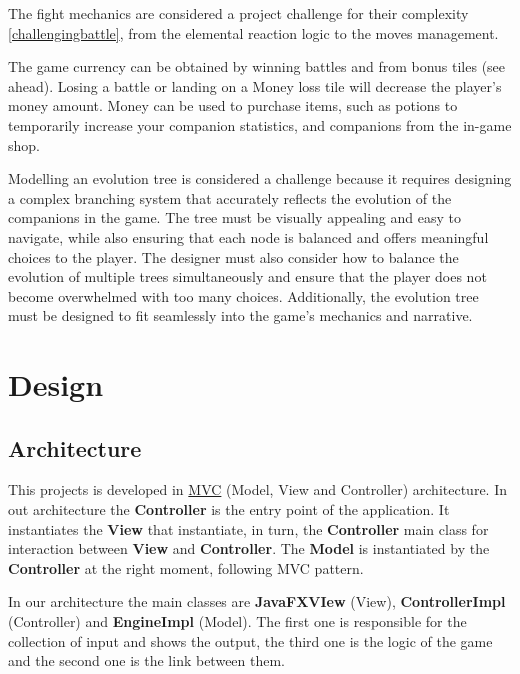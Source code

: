 \documentclass[12pt, a4paper]{report}
\begin{document}
    The fight mechanics are considered a project challenge for their complexity \ref{challengingbattle}, from the elemental reaction logic to the moves management.

    The game currency can be obtained by winning battles and from bonus tiles (see ahead).
    Losing a battle or landing on a Money loss tile will decrease the player's money amount.
    Money can be used to purchase items, such as potions to temporarily increase your companion statistics, and companions from the in-game shop.

    Modelling an evolution tree is considered a challenge because it requires designing a complex branching system that accurately reflects the evolution of the companions in the game. 
    The tree must be visually appealing and easy to navigate, while also ensuring that each node is balanced and offers meaningful choices to the player. 
    The designer must also consider how to balance the evolution of multiple trees simultaneously and ensure that the player does not become overwhelmed with too many choices. 
    Additionally, the evolution tree must be designed to fit seamlessly into the game's mechanics and narrative.

\chapter{Design}

\section{Architecture}

    This projects is developed in \href{https://en.wikipedia.org/wiki/Model%E2%80%93view%E2%80%93controller}{MVC} (Model, View and Controller) architecture.
    In out architecture the \textbf{Controller} is the entry point of the application. It instantiates the \textbf{View} that instantiate, in turn, the
    \textbf{Controller} main class for interaction between \textbf{View} and \textbf{Controller}. The \textbf{Model} is instantiated by the \textbf{Controller}
    at the right moment, following MVC pattern.

    In our architecture the main classes are \textbf{JavaFXVIew} (View), \textbf{ControllerImpl} (Controller) and \textbf{EngineImpl} (Model). The
    first one is responsible for the collection of input and shows the output, the third one is the logic of the game and the second one is the link between them.

\end{document}
